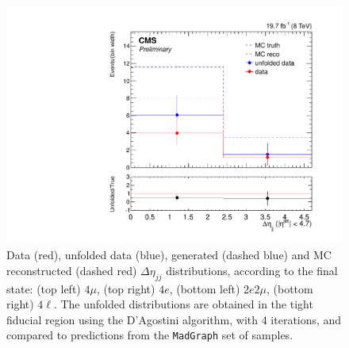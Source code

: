 \begin{figure}[hbtp]
\begin{center}
    \includegraphics[width=\cmsFigWidth]{Figures/Deta_ZZTo4l_Mad_fr}       
    \caption{\footnotesize{Data (red), unfolded data (blue), generated (dashed blue) and MC reconstructed (dashed red) $\Delta\eta_{jj}$ distributions, according to the final state: (top left) $4\mu$, (top right) $4e$, (bottom left) $2e2\mu$, (bottom right) $4\ell$. The unfolded distributions are obtained in the tight fiducial region using the D'Agostini algorithm, with 4 iterations, and compared to predictions from the \texttt{MadGraph} set of samples.}} 
    \label{fig:Deta_unfolding}
  \end{center}
\end{figure}

